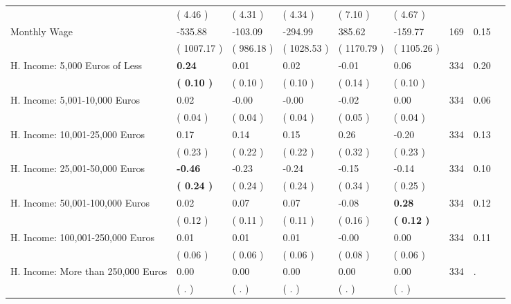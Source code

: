 \begin{tabular}{L{6.2cm} C{1.8cm} C{1.8cm} C{1.8cm} C{1.8cm} C{1.8cm} C{1.8cm} C{0.3cm} C{0.3cm}}
 & (     4.46 ) & (     4.31 ) & (     4.34 ) & (     7.10 ) & (     4.67 )  & \\
Monthly Wage &   -535.88 &   -103.09 &   -294.99 &    385.62 &   -159.77  & 169 &       0.15 \\ 
 & (  1007.17 ) & (   986.18 ) & (  1028.53 ) & (  1170.79 ) & (  1105.26 )  & \\
H. Income: 5,000 Euros of Less & \textbf{     0.24} &      0.01 &      0.02 &     -0.01 &      0.06  & 334 &       0.20 \\ 
 & \textbf{(     0.10 )} & (     0.10 ) & (     0.10 ) & (     0.14 ) & (     0.10 )  & \\
H. Income: 5,001-10,000 Euros &      0.02 &     -0.00 &     -0.00 &     -0.02 &      0.00  & 334 &       0.06 \\ 
 & (     0.04 ) & (     0.04 ) & (     0.04 ) & (     0.05 ) & (     0.04 )  & \\
H. Income: 10,001-25,000 Euros &      0.17 &      0.14 &      0.15 &      0.26 &     -0.20  & 334 &       0.13 \\ 
 & (     0.23 ) & (     0.22 ) & (     0.22 ) & (     0.32 ) & (     0.23 )  & \\
H. Income: 25,001-50,000 Euros & \textbf{    -0.46} &     -0.23 &     -0.24 &     -0.15 &     -0.14  & 334 &       0.10 \\ 
 & \textbf{(     0.24 )} & (     0.24 ) & (     0.24 ) & (     0.34 ) & (     0.25 )  & \\
H. Income: 50,001-100,000 Euros &      0.02 &      0.07 &      0.07 &     -0.08 & \textbf{     0.28}  & 334 &       0.12 \\ 
 & (     0.12 ) & (     0.11 ) & (     0.11 ) & (     0.16 ) & \textbf{(     0.12 )}  & \\
H. Income: 100,001-250,000 Euros &      0.01 &      0.01 &      0.01 &     -0.00 &      0.00  & 334 &       0.11 \\ 
 & (     0.06 ) & (     0.06 ) & (     0.06 ) & (     0.08 ) & (     0.06 )  & \\
H. Income: More than 250,000 Euros &      0.00 &      0.00 &      0.00 &      0.00 &      0.00  & 334 &          . \\ 
 & (        . ) & (        . ) & (        . ) & (        . ) & (        . )  & \\
\bottomrule
\end{tabular}
